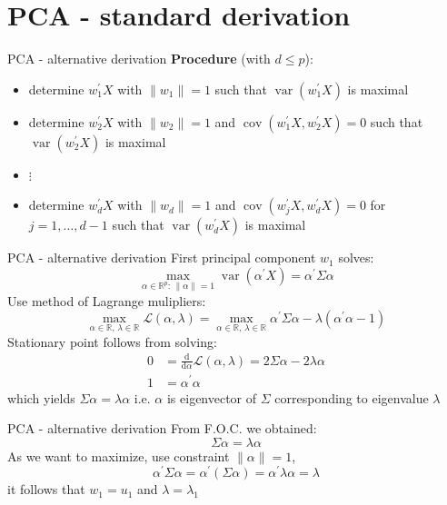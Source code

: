 \documentclass[pdf, handout]{beamer}
\newcommand{\var}{\operatorname{var}}
\newcommand{\rd}{\mathrm{d}}
\newcommand{\cov}{\operatorname{cov}}
\begin{document}
\section{PCA - standard derivation}


\begin{frame}{PCA - alternative derivation}
\textbf{Procedure} (with $d\leq p$):
\begin{itemize}
\item determine $w_1^\prime X$ with $\| w_1 \|=1$ such that $\var ( w_1^\prime X)$ is maximal
\pause\item determine $w_2^\prime X$ with $\| w_2 \|=1$  and $\cov( w_1^\prime X, w_2^\prime X ) =0$
such that $\var ( w_2^\prime X)$ is maximal
\item[] $\vdots$
\pause
\item determine $w_d^\prime X$ with $\| w_d \|=1$  and $\cov( w_j^\prime X, w_d^\prime X) =0$ for $j=1,\dots,d-1$
such that $\var ( w_d^\prime X)$ is maximal
\end{itemize}
\end{frame}

\begin{frame}{PCA - alternative derivation}
\vspace{-.25cm}
First principal component $w_1$ solves:
\[
\max_{\alpha \in\mathbb{R}^p :\, \| \alpha \|=1 } \var ( \alpha^\prime X) = \alpha^\prime \Sigma \alpha
\]
\pause
Use method of Lagrange mulipliers:
\[
\max_{\alpha \in\mathbb{R} ,\, \lambda\in\mathbb{R}} \mathcal{L}(\alpha,\lambda)= \max_{\alpha \in\mathbb{R} ,\, \lambda\in\mathbb{R}} \alpha^\prime \Sigma \alpha - \lambda (   \alpha^\prime \alpha -1)
\]
Stationary point follows from solving:
\begin{align*}
0&=\frac{\rd}{\rd \alpha} \mathcal{L}(\alpha,\lambda) = 2\Sigma \alpha - 2 \lambda \alpha \\
1&=\alpha^\prime \alpha
\end{align*}
which yields
\color{blue} $\Sigma\alpha =\lambda \alpha$ \color{black}
i.e. $\alpha$ is eigenvector of $\Sigma$ corresponding to eigenvalue $\lambda$
\end{frame}




\begin{frame}{PCA - alternative derivation}
From F.O.C. we obtained:
\[
\Sigma \alpha =\lambda \alpha
\]
As we want to maximize, use constraint $\|\alpha\|=1$,
\[
\alpha^\prime \Sigma \alpha = \alpha^\prime (\Sigma \alpha )
=\alpha^\prime \lambda \alpha = \lambda
\]
it follows that \color{blue} $w_1=u_1 $ \color{black} and \color{blue} $\lambda=\lambda_1$
\end{frame}
\end{document}
